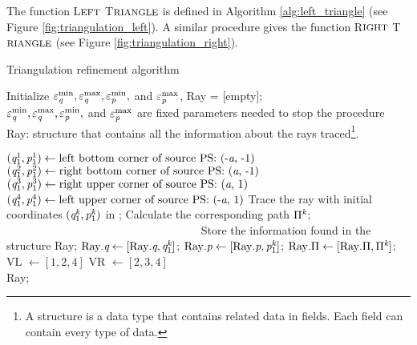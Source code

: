 The function L$\footnotesize{\textrm{EFT}}$ T$\footnotesize{\textrm{RIANGLE}}$ is defined in Algorithm \ref{alg:left_triangle} (see Figure \ref{fig:triangulation_left}). 
A similar procedure gives the function R$\footnotesize{\textrm{IGHT}}$ T$\footnotesize{\textrm{RIANGLE}}$ (see Figure \ref{fig:triangulation_right}).
\begin{algorithm}[h]
\caption{Triangulation refinement algorithm}\label{alg:triangulation}
Initialize $\varepsilon_{\textit{q}}^{\textrm{min}}, \varepsilon_{\textit{q}}^{\textrm{max}}, \varepsilon_{\textit{p}}^{\textrm{min}},$ and
 $\varepsilon_{\textit{p}}^{\textrm{max}}$, Ray = [empty];\\
\Comment $\varepsilon_{\textit{q}}^{\textrm{min}}, \varepsilon_{\textit{q}}^{\textrm{max}}, \varepsilon_{\textit{p}}^{\textrm{min}},$ and
 $\varepsilon_{\textit{p}}^{\textrm{max}}$ are fixed parameters needed to stop the procedure\\
\Comment Ray: structure that contains all the information about the rays traced\footnote{A structure is a data type that contains related data in fields. Each field can contain every type of data.}.
\begin{algorithmic}[1]
\State $(\textit{q}_1^1, \textit{p}_1^1)\gets \mbox{left bottom corner of source PS: (-\textit{a}, -1)}$
\State $(\textit{q}_1^2, \textit{p}_1^2) \gets \mbox{right bottom corner of source PS:  (\textit{a}, -1)}$
\State $(\textit{q}_1^3, \textit{p}_1^3)  \gets \mbox{right upper corner of source PS: (\textit{a}, 1)}$
\State $(\textit{q}_1^4, \textit{p}_1^4) \gets \mbox{left upper corner of source PS: (-\textit{a}, 1)} $
\State Trace the ray with initial coordinates $(\textit{q}_1^{\textit{k}}, \textit{p}_1^{\textit{k}})$ in ;
\State Calculate the corresponding path $\Pi^{\textit{k}}$; $\qquad \qquad \qquad \qquad \qquad \qquad \qquad \qquad\quad$
\Comment Store the information found in the structure Ray;
\State $\mbox{Ray}.\textit{q}\gets [\mbox{Ray}.\textit{q}, \textit{q}_1^{\textit{k}}]$;
\State $\mbox{Ray}.\textit{p}\gets [\mbox{Ray}.\textit{p}, \textit{p}_1^{\textit{k}}]$;
\State $\mbox{Ray}.\Pi\gets [\mbox{Ray}.\Pi, \Pi^{\textit{k}}]$;
\EndFor
\State VL $\gets [1, 2, 4]$ 
\State VR $\gets [2,3, 4]$   
\State {} 
\State {}  \\
\Return Ray;
\end{algorithmic}
\end{algorithm}
